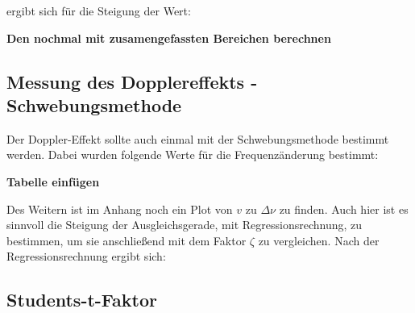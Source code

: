 \documentclass[parskip=half]{scrartcl} %
\begin{document}
ergibt sich für die Steigung der Wert:

\textbf{Den nochmal mit zusamengefassten Bereichen berechnen}


\subsection{Messung des Dopplereffekts - Schwebungsmethode}
Der Doppler-Effekt sollte auch einmal mit der Schwebungsmethode 
bestimmt werden.
Dabei wurden folgende Werte für die Frequenzänderung 
bestimmt:

\textbf{Tabelle einfügen}

Des Weitern ist im Anhang noch ein Plot von $v$ zu $\Delta \nu$ 
zu finden. Auch hier ist es sinnvoll die Steigung der Ausgleichsgerade, mit 
Regressionsrechnung, zu bestimmen, um sie anschließend mit dem 
Faktor $\zeta$ zu vergleichen.
Nach der Regressionsrechnung ergibt sich:

\subsection{Students-t-Faktor}
\printbibliography
\printindex
\end{document}
